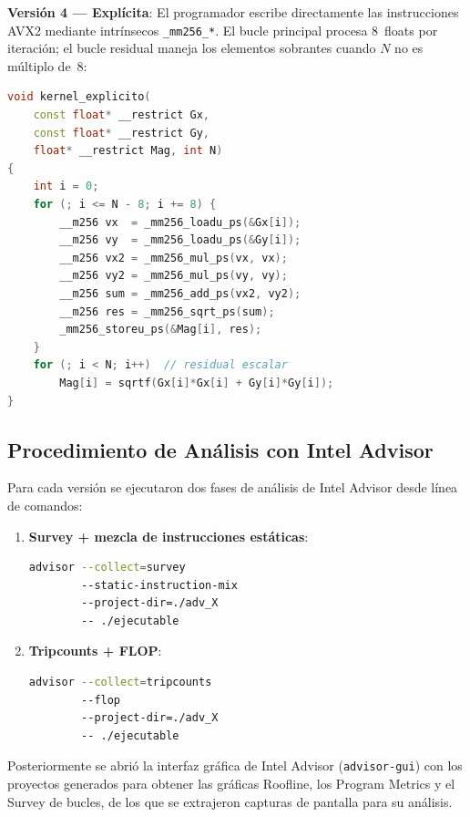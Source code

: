 \textbf{Versi\'on 4 — Expl\'icita}: El programador escribe
directamente las instrucciones AVX2 mediante intr\'insecos
\texttt{\_mm256\_*}.
El bucle principal procesa 8~floats por iteraci\'on; el bucle
residual maneja los elementos sobrantes cuando $N$ no es
m\'ultiplo de~8:

\begin{lstlisting}[language=C++,caption={Kernel con intr\'insecos AVX2 expl\'icitos.}]
void kernel_explicito(
    const float* __restrict Gx,
    const float* __restrict Gy,
    float* __restrict Mag, int N)
{
    int i = 0;
    for (; i <= N - 8; i += 8) {
        __m256 vx  = _mm256_loadu_ps(&Gx[i]);
        __m256 vy  = _mm256_loadu_ps(&Gy[i]);
        __m256 vx2 = _mm256_mul_ps(vx, vx);
        __m256 vy2 = _mm256_mul_ps(vy, vy);
        __m256 sum = _mm256_add_ps(vx2, vy2);
        __m256 res = _mm256_sqrt_ps(sum);
        _mm256_storeu_ps(&Mag[i], res);
    }
    for (; i < N; i++)  // residual escalar
        Mag[i] = sqrtf(Gx[i]*Gx[i] + Gy[i]*Gy[i]);
}
\end{lstlisting}

\subsection{Procedimiento de An\'alisis con Intel Advisor}

Para cada versi\'on se ejecutaron dos fases de an\'alisis de
Intel Advisor desde l\'inea de comandos:

\begin{enumerate}
  \item \textbf{Survey + mezcla de instrucciones est\'aticas}:
\begin{lstlisting}[language=bash,caption={Fase Survey de Intel Advisor.},numbers=none]
advisor --collect=survey
        --static-instruction-mix
        --project-dir=./adv_X
        -- ./ejecutable
\end{lstlisting}

  \item \textbf{Tripcounts + FLOP}:
\begin{lstlisting}[language=bash,caption={Fase Tripcounts de Intel Advisor.},numbers=none]
advisor --collect=tripcounts
        --flop
        --project-dir=./adv_X
        -- ./ejecutable
\end{lstlisting}
\end{enumerate}

Posteriormente se abri\'o la interfaz gr\'afica de Intel Advisor
(\texttt{advisor-gui}) con los proyectos generados para obtener
las gr\'aficas Roofline, los Program Metrics y el Survey de
bucles, de los que se extrajeron capturas de pantalla para su
an\'alisis.
